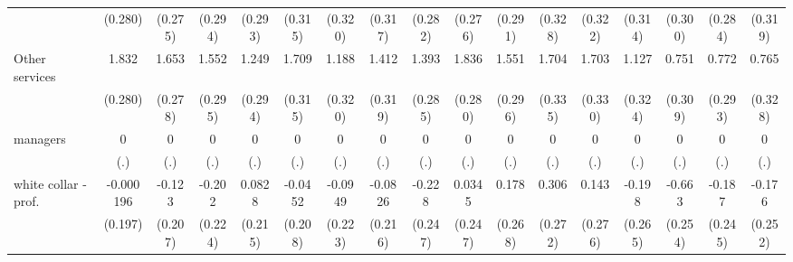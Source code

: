 {\begin{tabular}{l*{16}{c}}
                    &     (0.280)         &     (0.275)         &     (0.294)         &     (0.293)         &     (0.315)         &     (0.320)         &     (0.317)         &     (0.282)         &     (0.276)         &     (0.291)         &     (0.328)         &     (0.322)         &     (0.314)         &     (0.300)         &     (0.284)         &     (0.319)         \\
[1em]
Other services      &       1.832\sym{***}&       1.653\sym{***}&       1.552\sym{***}&       1.249\sym{***}&       1.709\sym{***}&       1.188\sym{***}&       1.412\sym{***}&       1.393\sym{***}&       1.836\sym{***}&       1.551\sym{***}&       1.704\sym{***}&       1.703\sym{***}&       1.127\sym{***}&       0.751\sym{*}  &       0.772\sym{**} &       0.765\sym{*}  \\
                    &     (0.280)         &     (0.278)         &     (0.295)         &     (0.294)         &     (0.315)         &     (0.320)         &     (0.319)         &     (0.285)         &     (0.280)         &     (0.296)         &     (0.335)         &     (0.330)         &     (0.324)         &     (0.309)         &     (0.293)         &     (0.328)         \\
[1em]
managers            &           0         &           0         &           0         &           0         &           0         &           0         &           0         &           0         &           0         &           0         &           0         &           0         &           0         &           0         &           0         &           0         \\
                    &         (.)         &         (.)         &         (.)         &         (.)         &         (.)         &         (.)         &         (.)         &         (.)         &         (.)         &         (.)         &         (.)         &         (.)         &         (.)         &         (.)         &         (.)         &         (.)         \\
[1em]
white collar - prof.&   -0.000196         &      -0.123         &      -0.202         &      0.0828         &     -0.0452         &     -0.0949         &     -0.0826         &      -0.228         &      0.0345         &       0.178         &       0.306         &       0.143         &      -0.198         &      -0.663\sym{**} &      -0.187         &      -0.176         \\
                    &     (0.197)         &     (0.207)         &     (0.224)         &     (0.215)         &     (0.208)         &     (0.223)         &     (0.216)         &     (0.247)         &     (0.247)         &     (0.268)         &     (0.272)         &     (0.276)         &     (0.265)         &     (0.254)         &     (0.245)         &     (0.252)         \\

\end{tabular}}
